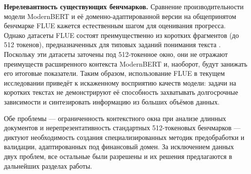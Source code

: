 \textbf{Нерелевантность существующих бенчмарков.} Сравнение производительности модели ModernBERT и её
доменно-адаптированной версии на общепринятом бенчмарке FLUE кажется естественным шагом для оценивания прогресса.
Однако датасеты FLUE состоят преимущественно из коротких фрагментов (до 512 токенов), предназначенных для типовых
заданий понимания текста \parencite{FLANG2022FLUE}. Поскольку эти датасеты заточены под 512-токенное окно, они не отражают
преимуществ расширенного контекста ModernBERT и, наоборот, будут занижать его итоговые показатели. Таким образом,
использование FLUE в текущем исследовании приведёт к искаженному восприятию качеств модели: задачи на коротких текстах
не демонстрируют её способность захватывать долгосрочные зависимости и синтезировать информацию из больших объёмов данных.

Обе проблемы — ограниченность контекстного окна при анализе длинных документов и нерепрезентативность
стандартных 512-токеновых бенчмарков — диктуют необходимость создания специализированных методик предобработки
и валидации, адаптированных под финансовый домен. За исключением данных двух проблем, все остальные были разрешены
и их решения предлагаются в дальнейших разделах работы.
